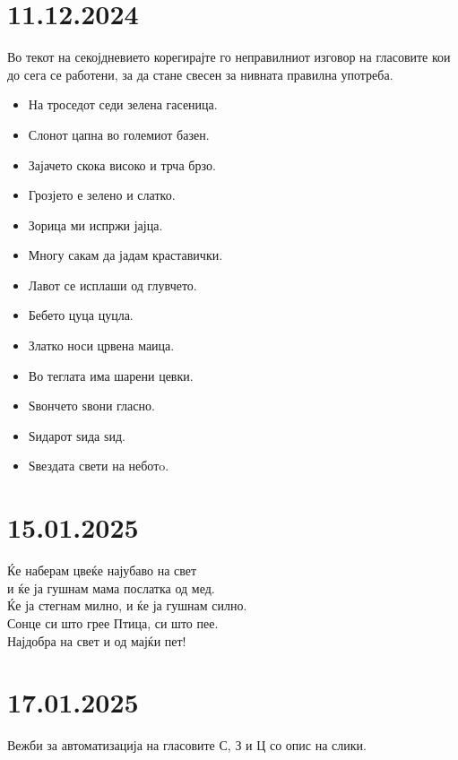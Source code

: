 \documentclass[a5paper,12pt]{article}
\newenvironment{instruction}{%
  \begin{tcolorbox}[colback=white,colframe=accentcolor,title={\textbf{Инструкции}},fonttitle=\bfseries] 
}{%
  \end{tcolorbox}
}
\newenvironment{song}{%
  \begin{tcolorbox}[colback=warmredbg,colframe=warmred,title={\textbf{Песничка}},fonttitle=\bfseries]
}{%
  \end{tcolorbox}
}
\begin{document}
\section{11.12.2024} 
\begin{instruction}
Во текот на секојдневието корегирајте го неправилниот изговор на гласовите кои до сега се работени, за да стане свесен за нивната правилна употреба.
\end{instruction}
\begin{itemize}
  \item На троседот седи зелена гасеница.
  \item Слонот цапна во големиот базен.
  \item Зајачето скока високо и трча брзо.
  \item Грозјето е зелено и слатко.
  \item Зорица ми испржи јајца.
  \item Многу сакам да јадам краставички.
  \item Лавот се исплаши од глувчето.
  \item Бебето цуца цуцла.
  \item Златко носи црвена маица.
  \item Во теглата има шарени цевки.
  \item Ѕвончето ѕвони гласно.
  \item Ѕидарот ѕида ѕид.
  \item Ѕвездата свети на неботo.
\end{itemize}

\section{15.01.2025}
\begin{song}
  Ќе наберам цвеќе најубаво на свет\\
  и ќе ја гушнам мама послатка од мед.\\

  Ќе ја стегнам милно, и ќе ја гушнам силно.\\
  Сонце си што грее Птица, си што пее.\\

  Најдобра на свет и од мајќи пет!
\end{song}

\section{17.01.2025}
Вежби за автоматизација на гласовите С, З и Ц со опис на слики.
\end{document}
